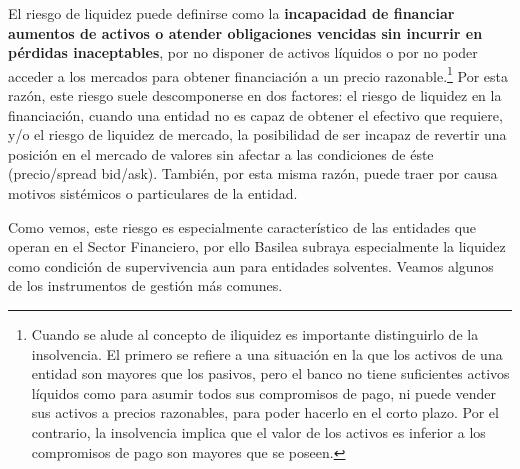 \documentclass[10pt,a4paper]{article}
\begin{document}
El riesgo de liquidez puede definirse como la \textbf{incapacidad de financiar aumentos de activos o atender obligaciones vencidas sin incurrir en pérdidas inaceptables}, por no disponer de activos líquidos o por no poder acceder a los mercados para obtener financiación a un precio razonable.\footnote{%
    Cuando se alude al concepto de iliquidez es importante distinguirlo de la insolvencia. El primero se refiere a una situación en la que los activos de una entidad son mayores que los pasivos, pero el banco no tiene suficientes activos líquidos como para asumir todos sus compromisos de pago, ni puede vender sus activos a precios razonables, para poder hacerlo en el corto plazo. Por el contrario, la insolvencia implica que el valor de los activos es inferior a los compromisos de pago son mayores que se poseen.
} Por esta razón, este riesgo suele descomponerse en dos factores: el riesgo de liquidez en la financiación, cuando una entidad no es capaz de obtener el efectivo que requiere, y/o el riesgo de liquidez de mercado, la posibilidad de ser incapaz de revertir una posición en el mercado de valores sin afectar a las condiciones de éste (precio/spread bid/ask). También, por esta misma razón, puede traer por causa motivos sistémicos o particulares de la entidad.

Como vemos, este riesgo es especialmente característico de las entidades que operan en el Sector Financiero, por ello Basilea subraya especialmente la liquidez como condición de supervivencia aun para entidades solventes. Veamos algunos de los instrumentos de gestión más comunes.
\end{document}
